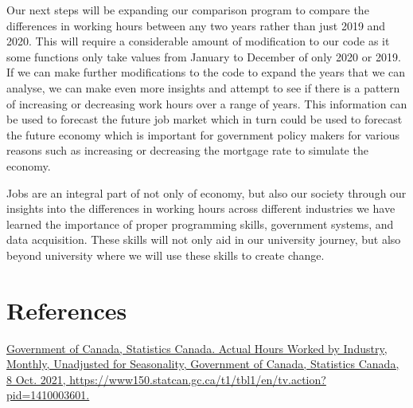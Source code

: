 \documentclass[fontsize=11pt]{article}
\begin{document}
\medskip

Our next steps will be expanding our comparison program to compare the differences in working hours between any two years rather than just 2019 and 2020. This will require a considerable amount of modification to our code as it some functions only take values from January to December of only 2020 or 2019. If we can make further modifications to the code to expand the years that we can analyse, we can make even more insights and attempt to see if there is a pattern of increasing or decreasing  work hours over a range of years. This information can be used to forecast the future job market which in turn could be used to forecast the future economy which is important for government policy makers for various reasons such as increasing or decreasing the mortgage rate to simulate the economy.

Jobs are an integral part of not only of economy, but also our society through our insights into the differences in working hours across different industries we have learned the importance of proper programming skills, government systems, and data acquisition. These skills will not only aid in our university journey, but also beyond university where we will use these skills to create change.


\section{References}
 
\href{ https://www150.statcan.gc.ca/t1/tbl1/en/tv.action?pid=1410003601 }{ Government of Canada, Statistics Canada. Actual Hours Worked by Industry, Monthly, Unadjusted for Seasonality, Government of Canada, Statistics Canada, 8 Oct. 2021, https://www150.statcan.gc.ca/t1/tbl1/en/tv.action?pid=1410003601. } 

  
  
  
\end{document}

